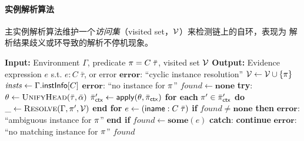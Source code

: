 \documentclass[a4paper, 11pt]{article}
\theoremstyle{remark}\newtheorem*{remark}{Remark}
\theoremstyle{definition}\newtheorem*{definition}{Definition}
\begin{document}
\paragraph{实例解析算法}
主实例解析算法维护一个\emph{访问集}（visited set，$\mathcal{V}$）来检测链上的自环，表现为
解析结果歧义或环导致的解析不停机现象。
\begin{algorithm}[H]
  \caption{Instance Resolution}
  \begin{algorithmic}[1]
    \State \textbf{Input:} Environment $\Gamma$, predicate $\pi = C\;\bar{\tau}$, visited set $\mathcal{V}$
    \State \textbf{Output:} Evidence expression $e$ s.t. $e :  C\;\bar{\tau}$, or error
    \State
    \If{$\Pred \in \Visited$} \label{line:cycle}
    \State \Return $\mathbf{error}$:  ``cyclic instance resolution''
    \EndIf
    \State $\mathcal{V} \gets \mathcal{V} \cup \{\pi\}$
    \State
    \State $\mathit{insts} \gets \Gamma.\mathsf{instInfo}[C]$ 
    \State \Return $\mathbf{error}$: ``no instance for $\pi$''
    \EndIf
    \State
    \State $\mathit{found} \gets \mathbf{none}$
     \label{line:search}
    \State \textbf{try}:
    \State \quad $\theta \gets \Call{UnifyHead}{\bar{\tau}, \bar{\alpha}}$ \label{line:unify}
    \State \quad $\bar{\pi}'_{\mathsf{ctx}} \gets \mathsf{apply}(\theta, \bar{\pi}_{\mathsf{ctx}})$ \label{line:apply-ctx}
    \State \quad \textbf{for each} $\pi' \in \bar{\pi}'_{\mathsf{ctx}}$ \textbf{do} \label{line:recurse}
    \State \quad\quad $\_ \gets \Call{Resolve}{\Gamma, \pi', \Visited}$ 
    \State \quad \textbf{end for}
    \State \quad $e \gets (\mathsf{iname} :  C\;\bar{\tau})$  \label{line:evidence}
    \State \quad \textbf{if} $\mathit{found} \neq \mathbf{none}$ \textbf{then} \label{line:ambig}
    \State \quad\quad \Return $\mathbf{error}$:  ``ambiguous instance for $\pi$''
    \State \quad \textbf{end if}
    \State \quad $\mathit{found} \gets \mathbf{some}(e)$
    \State \textbf{catch}:  \textbf{continue} 
    \EndFor
    \State
    \State \Return $\mathbf{error}$:  ``no matching instance for $\pi$''
    \EndIf
    \State \Return $\mathit{found}$
    \EndFunction
  \end{algorithmic}
\end{algorithm}
\end{document}

